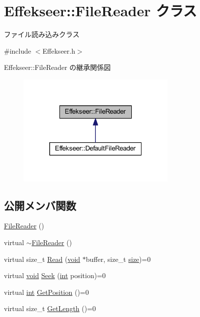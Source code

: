 \hypertarget{class_effekseer_1_1_file_reader}{}\section{Effekseer\+:\+:File\+Reader クラス}
\label{class_effekseer_1_1_file_reader}


ファイル読み込みクラス  




{\ttfamily \#include $<$Effekseer.\+h$>$}



Effekseer\+:\+:File\+Reader の継承関係図\nopagebreak
\begin{figure}[H]
\begin{center}
\leavevmode
\includegraphics[width=220pt]{class_effekseer_1_1_file_reader__inherit__graph}
\end{center}
\end{figure}
\subsection*{公開メンバ関数}
\begin{DoxyCompactItemize}
\item 
\mbox{\hyperlink{class_effekseer_1_1_file_reader_aa5ae7f1e7a6c8a8147e4f6d819b361c0}{File\+Reader}} ()
\item 
virtual \mbox{\hyperlink{class_effekseer_1_1_file_reader_a694f051a464abcda384734c3612062f2}{$\sim$\+File\+Reader}} ()
\item 
virtual size\+\_\+t \mbox{\hyperlink{class_effekseer_1_1_file_reader_a6274b775770e8ac9ba4f212c80e94be1}{Read}} (\mbox{\hyperlink{namespace_effekseer_ab34c4088e512200cf4c2716f168deb56}{void}} $\ast$buffer, size\+\_\+t \mbox{\hyperlink{namespace_effekseer_a73c68f3d33539d30844b9d1e058077f7}{size}})=0
\item 
virtual \mbox{\hyperlink{namespace_effekseer_ab34c4088e512200cf4c2716f168deb56}{void}} \mbox{\hyperlink{class_effekseer_1_1_file_reader_a5daeb98049f994bccf874b2374e36a25}{Seek}} (\mbox{\hyperlink{namespace_effekseer_ace0abf7c2e6947e519ebe8b54cbcc30a}{int}} position)=0
\item 
virtual \mbox{\hyperlink{namespace_effekseer_ace0abf7c2e6947e519ebe8b54cbcc30a}{int}} \mbox{\hyperlink{class_effekseer_1_1_file_reader_ad69aa533374ee6661938c7a81495b6d7}{Get\+Position}} ()=0
\item 
virtual size\+\_\+t \mbox{\hyperlink{class_effekseer_1_1_file_reader_ae802d02a06437baa0ed74f1927617924}{Get\+Length}} ()=0
\end{DoxyCompactItemize}


